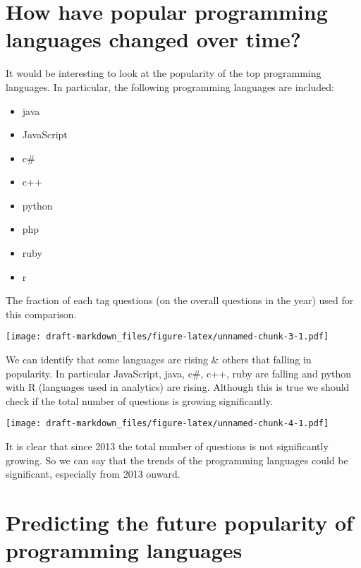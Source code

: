 \documentclass[
]{article}
\providecommand{\tightlist}{%
  \setlength{\itemsep}{0pt}\setlength{\parskip}{0pt}}
\begin{document}
\hypertarget{how-have-popular-programming-languages-changed-over-time}{%
\section{How have popular programming languages changed over
time?}\label{how-have-popular-programming-languages-changed-over-time}}

It would be interesting to look at the popularity of the top programming
languages. In particular, the following programming languages are
included:

\begin{itemize}
\tightlist
\item
  java
\item
  JavaScript\\
\item
  c\#\\
\item
  c++\\
\item
  python\\
\item
  php\\
\item
  ruby\\
\item
  r
\end{itemize}

The fraction of each tag questions (on the overall questions in the
year) used for this comparison.

\texttt{[image: draft-markdown\_files/figure-latex/unnamed-chunk-3-1.pdf]}

We can identify that some languages are rising \& others that falling in
popularity. In particular JavaScript, java, c\#, c++, ruby are falling
and python with R (languages used in analytics) are rising. Although
this is true we should check if the total number of questions is growing
significantly.

\texttt{[image: draft-markdown\_files/figure-latex/unnamed-chunk-4-1.pdf]}

It is clear that since 2013 the total number of questions is not
significantly growing. So we can say that the trends of the programming
languages could be significant, especially from 2013 onward.

\hypertarget{predicting-the-future-popularity-of-programming-languages}{%
\section{Predicting the future popularity of programming
languages}\label{predicting-the-future-popularity-of-programming-languages}}
\end{document}
